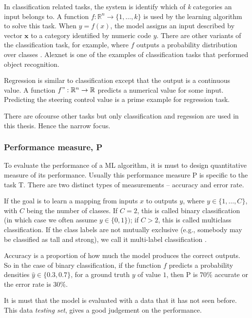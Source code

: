 In classification related tasks, the system is identify which of \textit{k} categories an
input belongs to. A function $f : \mathbb{R}^n \rightarrow\{1, \ldots,k\}$ is used by the
learning algorithm to solve this task. When $y = f(x)$, the model assigns an input
described by vector $\mathbf{x}$ to a category
identified by numeric code $y$. There are other variants of the classification
task, for example, where $f$ outputs a probability distribution over classes
\cite{Goodfellow-et-al-2016_1}. Alexnet \cite{Alexnet2012} is one of the examples of
classification tasks that performed object recognition.

Regression is similar to classification except that the output is a continuous value. A function $f
": \mathbb{R}^n \rightarrow \mathbb{R}$ predicts a numerical value for some input.
Predicting the steering control value is a prime example for regression task.

There are ofcourse other tasks but only classification and regession are used in this
thesis. Hence the narrow focus.

\subsubsection*{Performance measure, P}
To evaluate the performance of a ML algorithm, it is must to design quantitative measure
of its performance. Usually this performance measure P is specific to the task T. There
are two distinct types of measurements -- accuracy and error rate.

If the goal is to learn a mapping from inputs $x$ to outputs $y$, where $y \in \{1,\ldots
, C\}$, with $C$ being the number of classes. If $C = 2$, this is
called binary classification (in which case we often assume $y \in \{0, 1\})$; if $C > 2$, this is called
multiclass classification. If the class labels are not mutually exclusive (e.g., somebody may be
classified as tall and strong), we call it multi-label classification
\cite{murphy2013machine_1}.

Accuracy is a proportion of how much the model produces the correct outputs.
So in the case of binary classification, if the function $f$ predicts a probability
densities $\hat y \in \{0.3, 0.7\}$, for a ground truth $y$ of value $1$, then P is $70\%$
accurate or the error rate is $30\%$.

It is must that the model is evaluated with a data that it has not seen before. This data
\textit{testing set}, gives a good judgement on the performance.

